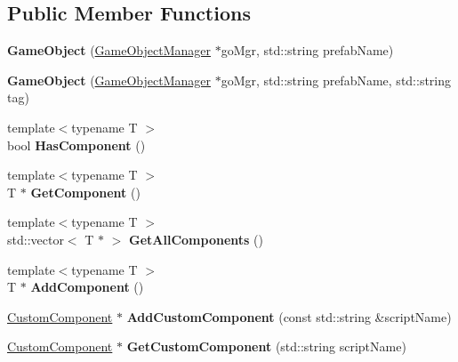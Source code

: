 \subsection*{Public Member Functions}
\begin{DoxyCompactItemize}
\item 
\mbox{\label{classGameObject_aada17b22194b4188379d8d7d56f87bc2}} 
{\bfseries Game\+Object} (\hyperlink{classGameObjectManager}{Game\+Object\+Manager} $\ast$go\+Mgr, std\+::string prefab\+Name)
\item 
\mbox{\label{classGameObject_a40bdca26a41d7266495ad380169f8376}} 
{\bfseries Game\+Object} (\hyperlink{classGameObjectManager}{Game\+Object\+Manager} $\ast$go\+Mgr, std\+::string prefab\+Name, std\+::string tag)
\item 
\mbox{\label{classGameObject_ace5e8a7bdb6bf548b534cae696ed0db1}} 
{\footnotesize template$<$typename T $>$ }\\bool {\bfseries Has\+Component} ()
\item 
\mbox{\label{classGameObject_a5ba3b458e6bee6ea5aedd5c8cdeabf18}} 
{\footnotesize template$<$typename T $>$ }\\T $\ast$ {\bfseries Get\+Component} ()
\item 
\mbox{\label{classGameObject_a0962252e1ed643ec1fde58da7dec4c2c}} 
{\footnotesize template$<$typename T $>$ }\\std\+::vector$<$ T $\ast$ $>$ {\bfseries Get\+All\+Components} ()
\item 
\mbox{\label{classGameObject_a811dc08b79009b3af153721df972e761}} 
{\footnotesize template$<$typename T $>$ }\\T $\ast$ {\bfseries Add\+Component} ()
\item 
\mbox{\label{classGameObject_ad388a379be13bf21977558f1e00906c3}} 
\hyperlink{classCustomComponent}{Custom\+Component} $\ast$ {\bfseries Add\+Custom\+Component} (const std\+::string \&script\+Name)
\item 
\mbox{\label{classGameObject_af5b410a717cc1b1b1729684f75a73f36}} 
\hyperlink{classCustomComponent}{Custom\+Component} $\ast$ {\bfseries Get\+Custom\+Component} (std\+::string script\+Name)

\end{DoxyCompactItemize}
